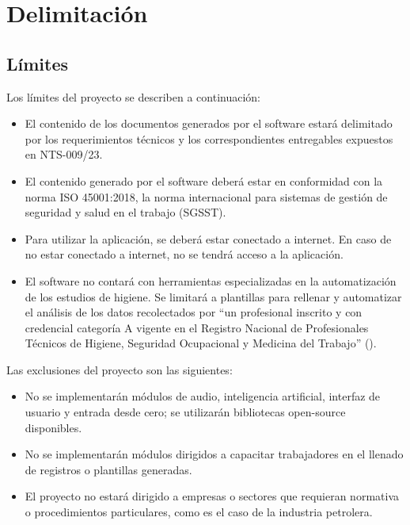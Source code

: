 
\section{Delimitación}
\subsection{Límites}

\noindent
Los límites del proyecto se describen a continuación:

\begin{itemize}[topsep=0pt]
	\item El contenido de los documentos generados por el software estará delimitado por los requerimientos técnicos y los correspondientes entregables expuestos en NTS-009/23.
	\item El contenido generado por el software deberá estar en conformidad con la norma ISO 45001:2018, la norma internacional para sistemas de gestión de seguridad y salud en el trabajo (SGSST).
	\item Para utilizar la aplicación, se deberá estar conectado a internet. En caso de no estar conectado a internet, no se tendrá acceso a la aplicación.
	\item El software no contará con herramientas especializadas en la automatización de los estudios de higiene. Se limitará a plantillas para rellenar y automatizar el análisis de los datos recolectados por ``un profesional inscrito y con credencial categoría A vigente en el Registro Nacional de Profesionales Técnicos de Higiene, Seguridad Ocupacional y Medicina del Trabajo'' (\cite{NTS-009/23}).
\end{itemize}

\noindent
Las exclusiones del proyecto son las siguientes:
\begin{itemize}[topsep=0pt]
	\item No se implementarán módulos de audio, inteligencia artificial, interfaz de usuario y entrada desde cero; se utilizarán bibliotecas open-source disponibles.
	\item No se implementarán módulos dirigidos a capacitar trabajadores en el llenado de registros o plantillas generadas.
	\item El proyecto no estará dirigido a empresas o sectores que requieran normativa o procedimientos particulares, como es el caso de la industria petrolera.
\end{itemize}

